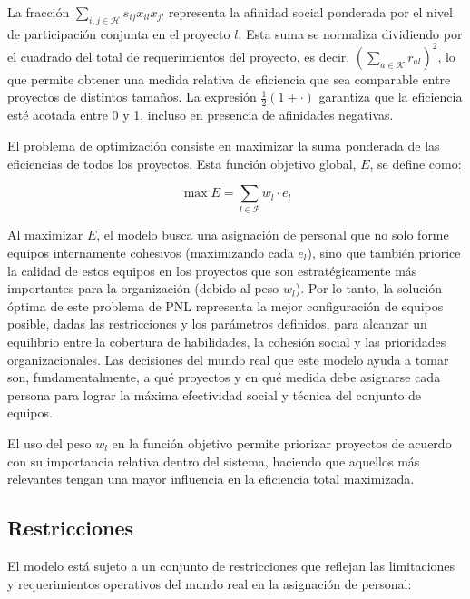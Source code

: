 \documentclass[conference]{IEEEtran}
\begin{document}
La fracción \(\sum_{i,j \in \mathcal{H}} s_{ij} x_{il} x_{jl}\) representa la afinidad social ponderada por el nivel de participación conjunta en el proyecto \(l\). Esta suma se normaliza dividiendo por el cuadrado del total de requerimientos del proyecto, es decir, \(\left(\sum_{a \in \mathcal{K}} r_{al}\right)^2\), lo que permite obtener una medida relativa de eficiencia que sea comparable entre proyectos de distintos tamaños. La expresión \( \frac{1}{2}(1 + \cdot) \) garantiza que la eficiencia esté acotada entre 0 y 1, incluso en presencia de afinidades negativas.

El problema de optimización consiste en maximizar la suma ponderada de las eficiencias de todos los proyectos. Esta función objetivo global, \(E\), se define como:

\begin{equation}
    \max E = \sum_{l \in \mathcal{P}} w_l \cdot e_l
    \label{eq:objective_total_updated} %
\end{equation}

Al maximizar \(E\), el modelo busca una asignación de personal que no solo forme equipos internamente cohesivos (maximizando cada \(e_l\)), sino que también priorice la calidad de estos equipos en los proyectos que son estratégicamente más importantes para la organización (debido al peso \(w_l\)). Por lo tanto, la solución óptima de este problema de PNL representa la mejor configuración de equipos posible, dadas las restricciones y los parámetros definidos, para alcanzar un equilibrio entre la cobertura de habilidades, la cohesión social y las prioridades organizacionales. Las decisiones del mundo real que este modelo ayuda a tomar son, fundamentalmente, a qué proyectos y en qué medida debe asignarse cada persona para lograr la máxima efectividad social y técnica del conjunto de equipos.

El uso del peso \(w_l\) en la función objetivo permite priorizar proyectos de acuerdo con su importancia relativa dentro del sistema, haciendo que aquellos más relevantes tengan una mayor influencia en la eficiencia total maximizada.

\subsection{Restricciones}
El modelo está sujeto a un conjunto de restricciones que reflejan las limitaciones y requerimientos operativos del mundo real en la asignación de personal:
\end{document}
